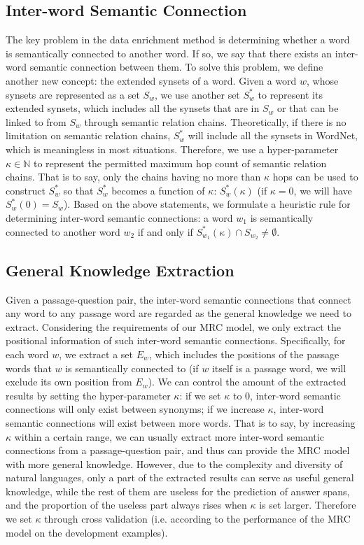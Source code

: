 \documentclass[11pt,a4paper]{article}
\begin{document}
\subsection{Inter-word Semantic Connection}
The key problem in the data enrichment method is determining whether a word is semantically connected to another word. If so, we say that there exists an inter-word semantic connection between them. To solve this problem, we define another new concept: the extended synsets of a word. Given a word $w$, whose synsets are represented as a set $S_w$, we use another set $S^*_w$ to represent its extended synsets, which includes all the synsets that are in $S_w$ or that can be linked to from $S_w$ through semantic relation chains. Theoretically, if there is no limitation on semantic relation chains, $S^*_w$ will include all the synsets in WordNet, which is meaningless in most situations. Therefore, we use a hyper-parameter $\kappa \in \mathbb{N}$ to represent the permitted maximum hop count of semantic relation chains. That is to say, only the chains having no more than $\kappa$ hops can be used to construct $S^*_w$ so that $S^*_w$ becomes a function of $\kappa$: $S^*_w(\kappa)$ (if $\kappa = 0$, we will have $S^*_w(0) = S_w$). Based on the above statements, we formulate a heuristic rule for determining inter-word semantic connections: a word $w_1$ is semantically connected to another word $w_2$ if and only if $S^*_{w_1}(\kappa) \cap S_{w_2} \ne \emptyset$.

\subsection{General Knowledge Extraction}
Given a passage-question pair, the inter-word semantic connections that connect any word to any passage word are regarded as the general knowledge we need to extract. Considering the requirements of our MRC model, we only extract the positional information of such inter-word semantic connections. Specifically, for each word $w$, we extract a set $E_w$, which includes the positions of the passage words that $w$ is semantically connected to (if $w$ itself is a passage word, we will exclude its own position from $E_w$). We can control the amount of the extracted results by setting the hyper-parameter $\kappa$: if we set $\kappa$ to $0$, inter-word semantic connections will only exist between synonyms; if we increase $\kappa$, inter-word semantic connections will exist between more words. That is to say, by increasing $\kappa$ within a certain range, we can usually extract more inter-word semantic connections from a passage-question pair, and thus can provide the MRC model with more general knowledge. However, due to the complexity and diversity of natural languages, only a part of the extracted results can serve as useful general knowledge, while the rest of them are useless for the prediction of answer spans, and the proportion of the useless part always rises when $\kappa$ is set larger. Therefore we set $\kappa$ through cross validation (i.e. according to the performance of the MRC model on the development examples).
\end{document}
